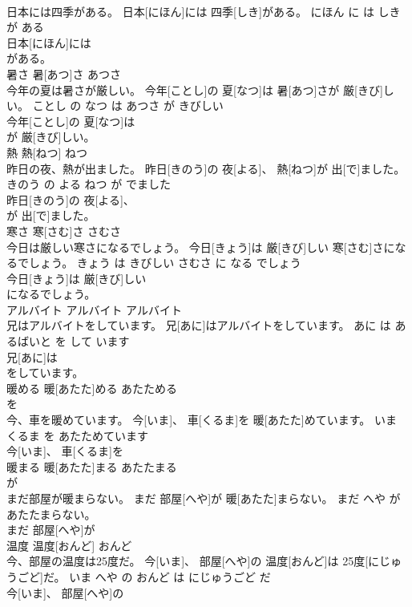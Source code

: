 \documentclass[8pt]{extreport}
\begin{document}
\begin{CJK}{UTF8}{min}
\\	日本には四季がある。	日本[にほん]には 四季[しき]がある。	にほん に は しき が ある	
\\	日本[にほん]には
\\	がある。		
\\	暑さ	暑[あつ]さ	あつさ	
\\	今年の夏は暑さが厳しい。	今年[ことし]の 夏[なつ]は 暑[あつ]さが 厳[きび]しい。	ことし の なつ は あつさ が きびしい	
\\	今年[ことし]の 夏[なつ]は
\\	が 厳[きび]しい。		
\\	熱	熱[ねつ]	ねつ	
\\	昨日の夜、熱が出ました。	昨日[きのう]の 夜[よる]、 熱[ねつ]が 出[で]ました。	きのう の よる ねつ が でました	
\\	昨日[きのう]の 夜[よる]、
\\	が 出[で]ました。		
\\	寒さ	寒[さむ]さ	さむさ	
\\	今日は厳しい寒さになるでしょう。	今日[きょう]は 厳[きび]しい 寒[さむ]さになるでしょう。	きょう は きびしい さむさ に なる でしょう	
\\	今日[きょう]は 厳[きび]しい
\\	になるでしょう。		
\\	アルバイト	アルバイト	アルバイト	
\\	兄はアルバイトをしています。	兄[あに]はアルバイトをしています。	あに は あるばいと を して います	
\\	兄[あに]は
\\	をしています。		
\\	暖める	暖[あたた]める	あたためる	
\\	を		
\\	今、車を暖めています。	今[いま]、 車[くるま]を 暖[あたた]めています。	いま くるま を あたためています	
\\	今[いま]、 車[くるま]を
\\	暖まる	暖[あたた]まる	あたたまる	
\\	が		
\\	まだ部屋が暖まらない。	まだ 部屋[へや]が 暖[あたた]まらない。	まだ へや が あたたまらない。	
\\	まだ 部屋[へや]が
\\	温度	温度[おんど]	おんど	
\\	今、部屋の温度は25度だ。	今[いま]、 部屋[へや]の 温度[おんど]は 25度[にじゅうごど]だ。	いま へや の おんど は にじゅうごど だ	
\\	今[いま]、 部屋[へや]の

\end{CJK}
\end{document}
